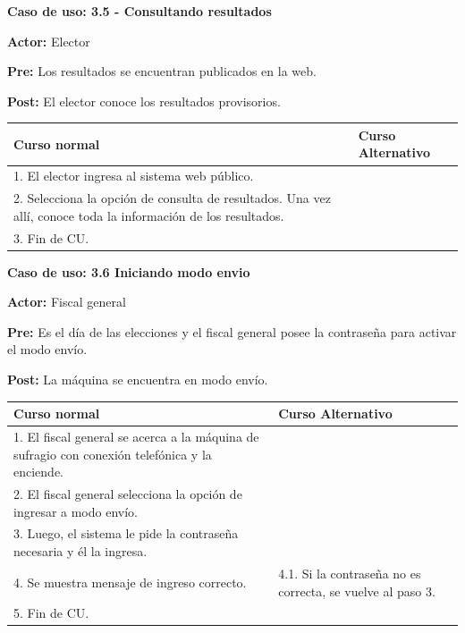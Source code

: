 \textbf{Caso de uso: 3.5 - Consultando resultados} 

\textbf{Actor:} Elector

\textbf{Pre:} Los resultados se encuentran publicados en la web.

\textbf{Post:} El elector conoce los resultados provisorios.

\begin{table}[h!]
	
 \begin{tabular}{|p{7.5cm} | p{7.5cm}|} 
 \hline
 \textbf{Curso normal} & \textbf{Curso Alternativo} \\
 \hline
 
1. El elector ingresa al sistema web público. & \\
\hline


2. Selecciona la opción de consulta de resultados. Una vez allí, conoce toda la información de los resultados. & \\
\hline


3. Fin de CU. & \\
\hline
\end{tabular}
\end{table}



\textbf{Caso de uso: 3.6 Iniciando modo envio}

\textbf{Actor:} Fiscal general

\textbf{Pre:} Es el día de las elecciones y el fiscal general posee la contraseña para activar el modo envío.

\textbf{Post:} La máquina se encuentra en modo envío.

\begin{table}[h!]
	
 \begin{tabular}{|p{7.5cm} | p{7.5cm}|} 
 \hline
 \textbf{Curso normal} & \textbf{Curso Alternativo} \\
 \hline

1. El fiscal general se acerca a la máquina de sufragio con conexión telefónica y la enciende. & \\
\hline

2. El fiscal general selecciona la opción de ingresar a modo envío. & \\
\hline

3. Luego, el sistema le pide la contraseña necesaria y él la ingresa. & \\
\hline

4. Se muestra mensaje de ingreso correcto. &
4.1. Si la contraseña no es correcta, se vuelve al paso 3. \\
\hline
5. Fin de CU. \\

\end{tabular}
\end{table}


